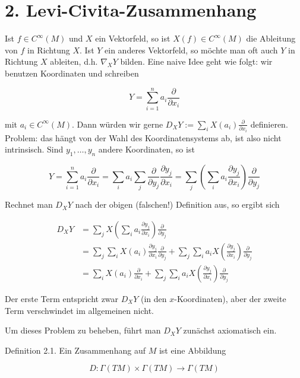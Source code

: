 \documentclass[10pt, letterpaper]{article}
\begin{document}
\section*{2. Levi-Civita-Zusammenhang}
Ist $f \in C^{\infty}(M)$ und $X$ ein Vektorfeld, so ist $X(f) \in C^{\infty}(M)$ die Ableitung von $f$ in Richtung $X$. Ist $Y$ ein anderes Vektorfeld, so möchte man oft auch $Y$ in Richtung $X$ ableiten, d.h. $\nabla_{X} Y$ bilden. Eine naive Idee geht wie folgt: wir benutzen Koordinaten und schreiben

$$
Y=\sum_{i=1}^{n} a_{i} \frac{\partial}{\partial x_{i}}
$$

mit $a_{i} \in C^{\infty}(M)$. Dann würden wir gerne $D_{X} Y:=\sum_{i} X\left(a_{i}\right) \frac{\partial}{\partial x_{i}}$ definieren. Problem: das hängt von der Wahl des Koordinatensystems ab, ist also nicht intrinsisch. Sind $y_{1}, \ldots, y_{n}$ andere Koordinaten, so ist

$$
Y=\sum_{i=1}^{n} a_{i} \frac{\partial}{\partial x_{i}}=\sum_{i} a_{i} \sum_{j} \frac{\partial}{\partial y_{j}} \frac{\partial y_{j}}{\partial x_{i}}=\sum_{j}\left(\sum_{i} a_{i} \frac{\partial y_{j}}{\partial x_{i}}\right) \frac{\partial}{\partial y_{j}}
$$

Rechnet man $D_{X} Y$ nach der obigen (falschen!) Definition aus, so ergibt sich

$$
\begin{aligned}
D_{X} Y & =\sum_{j} X\left(\sum_{i} a_{i} \frac{\partial y_{j}}{\partial x_{i}}\right) \frac{\partial}{\partial y_{j}} \\
& =\sum_{j} \sum_{i} X\left(a_{i}\right) \frac{\partial y_{j}}{\partial x_{i}} \frac{\partial}{\partial y_{j}}+\sum_{j} \sum_{i} a_{i} X\left(\frac{\partial y_{j}}{\partial x_{i}}\right) \frac{\partial}{\partial y_{j}} \\
& =\sum_{i} X\left(a_{i}\right) \frac{\partial}{\partial x_{i}}+\sum_{j} \sum_{i} a_{i} X\left(\frac{\partial y_{j}}{\partial x_{i}}\right) \frac{\partial}{\partial y_{j}}
\end{aligned}
$$

Der erste Term entspricht zwar $D_{X} Y$ (in den $x$-Koordinaten), aber der zweite Term verschwindet im allgemeinen nicht.

Um dieses Problem zu beheben, führt man $D_{X} Y$ zunächst axiomatisch ein.

Definition 2.1. Ein Zusammenhang auf $M$ ist eine Abbildung

$$
D: \Gamma(T M) \times \Gamma(T M) \rightarrow \Gamma(T M)
$$
\end{document}
